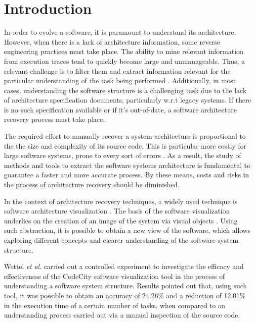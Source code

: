 \documentclass{sig-alternate-05-2015}
\begin{document}
%
%

%
%
\printccsdesc



\section{Introduction}
In order to evolve a software, it is paramount to understand its architecture. However, when there is a lack of architecture information, some reverse engineering practices must take place. The ability to mine relevant information from execution traces tend to quickly become large and unmanageable. Thus, a relevant challenge is to filter them and extract information relevant for the particular understanding of the task being performed \cite{canfora_achievements_2011}. Additionally, in most cases, understanding the software structure is a challenging task due to the lack of architecture specification documents, particularly w.r.t legacy systems.  If there is no such specification available or if it’s out-of-date, a software architecture recovery process must take place.

The required effort to manually recover a system architecture is proportional to the the size and complexity of its source code. This is particular more costly for large software systems, prone to every sort of errors \cite{zapalowski_revealing_2014}. As a result, the study of methods and tools to extract the software systems architecture is fundamental to guarantee a faster and more accurate process. By these means, costs and risks in the process of architecture recovery should be diminished.

In the context of architecture recovery techniques, a widely used technique is software architecture visualization  \cite {ghanam_survey_2008, teyseyre_overview_2009, lanza_codecrawler-lessons_2003, Feijs_loe}. The basis of the software visualization underlies on the creation of an image of the system via visual objects  \cite{teyseyre_overview_2009}. Using such abstraction, it is possible to obtain a new view of the software, which allows exploring different concepts and clearer understanding of the software system structure.

Wettel \textit{et al.} \cite{wettel_software_2011} carried out a controlled experiment to investigate the efficacy and effectiveness of the CodeCity software visualization tool in the process of understanding a software system structure. Results pointed out that, using such tool, it was possible to obtain an accuracy of 24.26\% and a reduction of 12.01\% in the execution time of a certain number of tasks, when compared to an understanding process carried out via a manual inspection of the source code.
\end{document}
